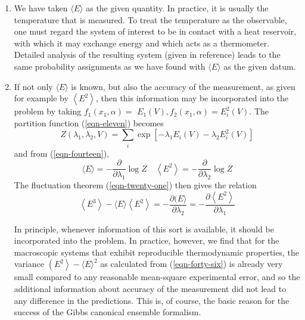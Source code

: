 \documentclass[]{article}
\begin{document}
\begin{enumerate}
    
\item  We have taken $\langle E \rangle$ as the given quantity. In practice, it is usually the temperature that is measured. To treat the temperature as the observable, one must regard the system of interest to be in contact with a heat reservoir, with which it may exchange energy and which acts as a thermometer. Detailed analysis of the resulting system (given in reference\citep{Jaynes-information57}) leads to the same probability assignments as we have found with
$\langle E \rangle$ as the
given datum.

\item  If not only $\langle E\rangle$ is known, but also the accuracy of the measurement, as given for example by $\left\langle E^{2}\right\rangle$, then this information may be incorporated into the problem by taking $f_{1}\left(x_{1}, \alpha\right)=$ $E _{1}( V ), f _{2}\left( x _{ 1 }, \alpha\right)= E _{ i }^{2}( V ) .$ The partition function (\ref{eqn-eleven}) becomes 
\begin{equation}
Z \left(\lambda_{1}, \lambda_{2}, V \right)=\sum_{ i } \exp \left[-\lambda_{1} E _{ i }( V )-\lambda_{2} E _{ i }^{2}( V )\right]
\end{equation}
and from (\ref{eqn-fourteen}),
\begin{equation}
\langle E \rangle=-\frac{\partial}{\partial \lambda_{1}} \log Z \quad\left\langle E ^{2}\right\rangle=-\frac{\partial}{\partial \lambda_{2}} \log Z
\end{equation}
The fluctuation theorem (\ref{eqn-twenty-one}) then gives the relation
\begin{equation}
\left\langle E^{3}\right\rangle-\langle E\rangle\left\langle E^{2}\right\rangle=-\frac{\partial(E\rangle}{\partial \lambda_{2}}=-\frac{\partial\left\langle E^{2}\right\rangle}{\partial \lambda_{1}}
\end{equation}

In principle, whenever information of this sort is available, it should be incorporated into the problem. In practice, however, we find that for the macroscopic systems that exhibit reproducible thermodynamic properties, the variance $\left(E^{2}\right\rangle-\langle E\rangle^{2}$ as calculated from (\ref{eqn-forty-six}) is already very small compared to any reasonable mean-square experimental error, and so the additional information about accuracy of the measurement did not lead to any difference in the predictions. This is, of course, the basic reason for the success of the Gibbs canonical ensemble formalism.


\end{enumerate}
\end{document}
